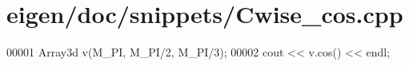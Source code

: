 \hypertarget{eigen_2doc_2snippets_2_cwise__cos_8cpp_source}{}\section{eigen/doc/snippets/\+Cwise\+\_\+cos.cpp}
\label{eigen_2doc_2snippets_2_cwise__cos_8cpp_source}

\begin{DoxyCode}
00001 Array3d v(M\_PI, M\_PI/2, M\_PI/3);
00002 cout << v.cos() << endl;
\end{DoxyCode}

